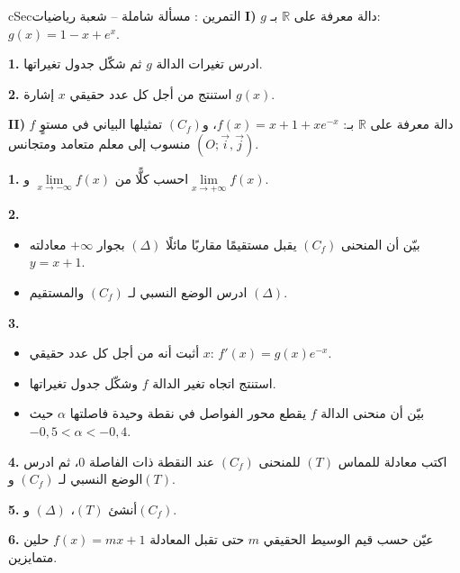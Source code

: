 \documentclass[12pt,a4paper]{article}
\newenvironment{BOX}[2]{\begin{otherlanguage}{english}\begin{arbox}{#1}{#2}}{\end{arbox}\end{otherlanguage}}
\newcounter{exo}
\newenvironment{tamrin}[1]{\stepcounter{exo}\begin{BOX}{cSec}{التمرين \theexo: #1}}{\end{BOX}}
\newcommand{\R}{\mathbb{R}}
\newenvironment{sq}{\begin{itemize}[leftmargin=2.4em,itemsep=3pt]}{\end{itemize}}
\newcommand{\qa}{\item[(أ)]}\newcommand{\qb}{\item[(ب)]}\newcommand{\qc}{\item[(جـ)]}\newcommand{\qd}{\item[(د)]}\newcommand{\qe}{\item[(هـ)]}
\newcommand{\QQ}[1]{\par\smallskip\textbf{#1.} }
\begin{document}
\begin{tamrin}{مسألة شاملة -- شعبة رياضيات}
\textbf{I)} $g$ دالة معرفة على $\R$ بـ: $g(x)=1-x+e^{x}$.
\QQ{1} ادرس تغيرات الدالة $g$ ثم شكّل جدول تغيراتها.
\QQ{2} استنتج من أجل كل عدد حقيقي $x$ إشارة $g(x)$.

\textbf{II)} $f$ دالة معرفة على $\R$ بـ: $f(x)=x+1+xe^{-x}$، و$(C_f)$ تمثيلها البياني في مستوٍ منسوب إلى معلم متعامد ومتجانس $(O;\vec i,\vec j)$.
\QQ{1} احسب كلًّا من $\lim\limits_{x\to-\infty}f(x)$ و$\lim\limits_{x\to+\infty}f(x)$.
\QQ{2}
\begin{sq}
\qa بيّن أن المنحنى $(C_f)$ يقبل مستقيمًا مقاربًا مائلًا $(\Delta)$ بجوار $+\infty$ معادلته $y=x+1$.
\qb ادرس الوضع النسبي لـ $(C_f)$ والمستقيم $(\Delta)$.
\end{sq}
\QQ{3}
\begin{sq}
\qa أثبت أنه من أجل كل عدد حقيقي $x$: $f'(x)=g(x)e^{-x}$.
\qb استنتج اتجاه تغير الدالة $f$ وشكّل جدول تغيراتها.
\qc بيّن أن منحنى الدالة $f$ يقطع محور الفواصل في نقطة وحيدة فاصلتها $\alpha$ حيث $-0{,}5<\alpha<-0{,}4$.
\end{sq}
\QQ{4} اكتب معادلة للمماس $(T)$ للمنحنى $(C_f)$ عند النقطة ذات الفاصلة $0$، ثم ادرس الوضع النسبي لـ $(C_f)$ و$(T)$.
\QQ{5} أنشئ $(T)$، $(\Delta)$ و$(C_f)$.
\QQ{6} عيّن حسب قيم الوسيط الحقيقي $m$ حتى تقبل المعادلة $f(x)=mx+1$ حلين متمايزين.
\end{tamrin}
\end{document}
